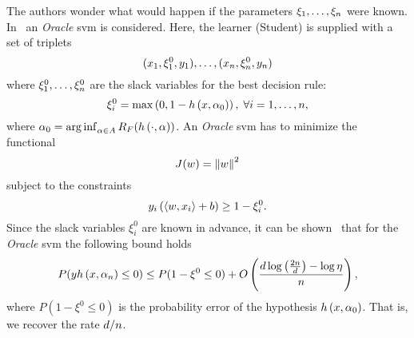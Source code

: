 The authors wonder what would happen if the parameters $\xi_1, \ldots, \xi_n$ were known.
In~\cite{VapnikI15a} an \emph{Oracle} \acrshort{svm} is considered. Here, the learner (Student) is supplied with a set of triplets
\begin{equation}
    \nonumber
    (x_1, \xi_1^0, y_1), \ldots, (x_n, \xi_n^0, y_n)
\end{equation}
where $\xi^0_1, \ldots, \xi^0_n$ are the slack variables for the best decision rule:
\begin{equation}
    \nonumber
    \xi_i^0 = \max \left(0, 1 - h\left(x, \alpha_0\right)  \right), \; \forall i = 1, \ldots, n ,
\end{equation}
where $\alpha_0 = \operatorname*{arg\inf}_{\alpha \in A} R_F(h\left(\cdot, \alpha\right)) $.
An \emph{Oracle} \acrshort{svm} has to minimize the functional
$$J(w) = \left\lVert w\right\rVert^2$$
subject to the constraints
$$y_i \left( \left\langle w, x_i \right\rangle + b \right) \geq 1 - \xi_i^0 .$$
Since the slack variables $\xi_i^0$ are known in advance, it can be shown~\citep{VapnikV09} that for the \emph{Oracle} \acrshort{svm} the following bound holds
\begin{equation}
    \nonumber
    P(y h\left(x, \alpha_n\right) \leq 0) \leq P(1 - \xi^0 \leq 0) + O\left( \frac{d \log\left(\frac{2n}{d} \right) - \log\eta}{n}  \right) ,
\end{equation}
where $P(1 - \xi^0 \leq 0)$ is the probability error of the hypothesis $h\left(x, \alpha_0\right)$.
That is, we recover the rate $d/n$.

